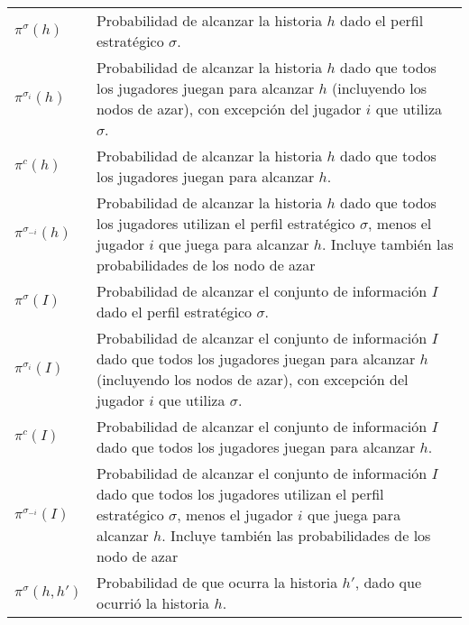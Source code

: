\begingroup
\renewcommand{\arraystretch}{1.5}
\begin{tabular}{l p{12cm}}
$\pi^{\sigma}(h)$ & Probabilidad de alcanzar la historia $h$ dado el perfil estratégico $\sigma$. \\
$\pi^{\sigma_i}(h)$ & Probabilidad de alcanzar la historia $h$ dado que todos los jugadores juegan para alcanzar $h$ (incluyendo los nodos de azar), con excepción del jugador $i$ que utiliza $\sigma$. \\
$\pi^c(h)$ & Probabilidad de alcanzar la historia $h$ dado que todos los jugadores juegan para alcanzar $h$. \\
$\pi^{\sigma_{-i}}(h)$ & Probabilidad de alcanzar la historia $h$ dado que todos los jugadores utilizan el perfil estratégico $\sigma$, menos el jugador $i$ que juega para alcanzar $h$. Incluye también las probabilidades de los nodo de azar \\
$\pi^{\sigma}(I)$ & Probabilidad de alcanzar el conjunto de información $I$ dado el perfil estratégico $\sigma$. \\
$\pi^{\sigma_i}(I)$ & Probabilidad de alcanzar el conjunto de información $I$ dado que todos los jugadores juegan para alcanzar $h$ (incluyendo los nodos de azar), con excepción del jugador $i$ que utiliza $\sigma$. \\
$\pi^c(I)$ & Probabilidad de alcanzar el conjunto de información $I$ dado que todos los jugadores juegan para alcanzar $h$. \\
$\pi^{\sigma_{-i}}(I)$ & Probabilidad de alcanzar el conjunto de información $I$ dado que todos los jugadores utilizan el perfil estratégico $\sigma$, menos el jugador $i$ que juega para alcanzar $h$. Incluye también las probabilidades de los nodo de azar \\
$\pi^{\sigma}(h, h')$ & Probabilidad de que ocurra la historia $h'$, dado que ocurrió la historia $h$. \\
\end{tabular}
\endgroup
